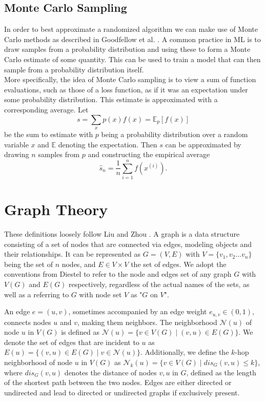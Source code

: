 \subsection{Monte Carlo Sampling}
In order to best approximate a randomized algorithm we can make use of Monte Carlo methods as described in Goodfellow et al. \cite{Goodfellow-et-al-2016}. A common practice in ML is to draw samples from a probability distribution and using these to form a Monte Carlo estimate of some quantity. This can be used to train a model that can then sample from a probability distribution itself. \\
More specifically, the idea of Monte Carlo sampling is to view a sum of function evaluations, such as those of a loss function, as if it was an expectation under some probability distribution. This estimate is approximated with a corresponding average.
Let 
\begin{equation}
    s = \sum_x p(x)f(x)=\mathbb{E}_p[f(x)]
\end{equation}
be the sum to estimate with $p$ being a probability distribution over a random variable $x$ and $\mathbb{E}$ denoting the expectation. Then $s$ can be approximated by drawing $n$ samples from $p$ and constructing the empirical average 
\begin{equation}
    \hat{s}_n=\frac{1}{n}\sum_{i=1}^n f(x^{(i)}).
\end{equation}


\section{Graph Theory}
\label{sec:graph_theory}
These definitions loosely follow Liu and Zhou \cite{Liu2020}. A graph is a data structure consisting of a set of nodes that are connected via edges, modeling objects and their relationships. It can be represented as $G=(V,E)$ with $V=\{v_1,v_2...v_n\}$ being the set of $n$ nodes, and $E \in V \times V$ the set of edges. We adopt the conventions from Diestel \cite{Diestel2017} to refer to the node and edges set of any graph $G$ with $V(G)$ and $E(G)$ respectively, regardless of the actual names of the sets, as well as a referring to $G$ with node set $V$ as "$G$ on $V$". \bigskip

An edge $e=(u,v)$, sometimes accompanied by an edge weight $e_{u,v}\in (0,1)$, connects nodes $u$ and $v$, making them neighbors. The neighborhood $\mathcal{N}(u)$ of node $u$ in $V(G)$ is defined as $\mathcal{N}(u) = \{v \in V(G) \mid (v,u) \in E(G)\}$. We denote the set of edges that are incident to $u$ as $E(u) = \{(v,u) \in E(G) \mid v \in \mathcal{N}(u)\}$. Additionally, we define the $k$-hop neighborhood of node $u$ in $V(G)$ as $\mathcal{N}_k(u) = \{v \in V(G) \mid dis_G(v,u) \leq k\}$, where $dis_G(v,u)$ denotes the distance of nodes $v, u$ in $G$, defined as the length of the shortest path between the two nodes. Edges are either directed or undirected and lead to directed or undirected graphs if exclusively present. \bigskip

